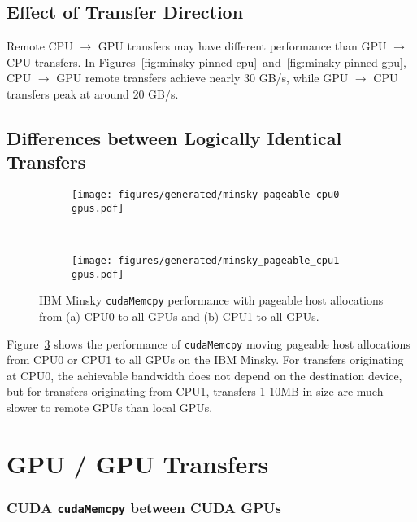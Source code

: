 \subsection{Effect of Transfer Direction}

Remote CPU $\rightarrow$ GPU transfers may have different performance than GPU $\rightarrow$ CPU transfers.
        In Figures~\ref{fig:minsky-pinned-cpu}~and~\ref{fig:minsky-pinned-gpu}, CPU $\rightarrow$ GPU remote transfers achieve nearly 30 GB/s, while GPU $\rightarrow$ CPU transfers peak at around 20 GB/s.

\subsection{Differences between Logically Identical Transfers}

\begin{figure}[ht]
    \centering
    \begin{subfigure}[b]{0.45\textwidth}
        \texttt{[image: figures/generated/minsky\_pageable\_cpu0-gpus.pdf]}
        \caption{}
        \label{fig:}
    \end{subfigure}
    ~
    \begin{subfigure}[b]{0.45\textwidth}
        \texttt{[image: figures/generated/minsky\_pageable\_cpu1-gpus.pdf]}
        \caption{}
        \label{fig:}
    \end{subfigure}
    \caption[]{
        IBM Minsky \texttt{cudaMemcpy} performance with pageable host allocations from (a) CPU0 to all GPUs and (b) CPU1 to all GPUs.
    }
    \label{fig:topo-asymmetry}
\end{figure}

Figure~\ref{fig:topo-asymmetry} shows the performance of \texttt{cudaMemcpy} moving pageable host allocations from CPU0 or CPU1 to all GPUs on the IBM Minsky.
For transfers originating at CPU0, the achievable bandwidth does not depend on the destination device, but for transfers originating from CPU1, transfers 1-10MB in size are much slower to remote GPUs than local GPUs.



\section{GPU / GPU Transfers}


\subsubsection{CUDA \texttt{cudaMemcpy} between CUDA GPUs}

